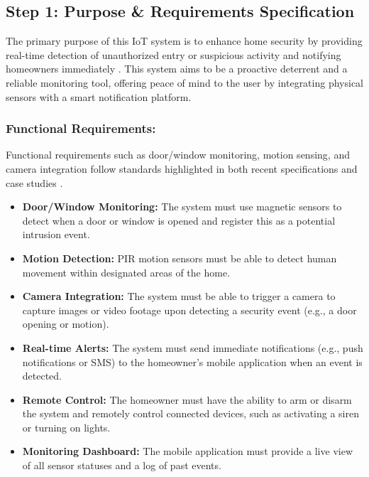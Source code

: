 \documentclass[conference]{IEEEtran}
\begin{document}
\subsection{Step 1: Purpose \& Requirements Specification}
The primary purpose of this IoT system is to enhance home security by providing real-time detection of unauthorized entry or suspicious activity and notifying homeowners immediately \cite{yamini_home_intrusion_2016, achtaich2021guidelines, seerangan_domain_specific_iot_home_automation_2022}. This system aims to be a proactive deterrent and a reliable monitoring tool, offering peace of mind to the user by integrating physical sensors with a smart notification platform.
\subsubsection{\textbf{Functional Requirements:}}
Functional requirements such as door/window monitoring, motion sensing, and camera integration follow standards highlighted in both recent specifications and case studies \cite{wang_iot_devices_security_2024, design_implementation_smart_home_IoT_2024}.
\begin{itemize}
    \item \textbf{Door/Window Monitoring:} The system must use magnetic sensors to detect when a door or window is opened and register this as a potential intrusion event.
    \item \textbf{Motion Detection:} PIR motion sensors must be able to detect human movement within designated areas of the home.
    \item \textbf{Camera Integration:} The system must be able to trigger a camera to capture images or video footage upon detecting a security event (e.g., a door opening or motion).
    \item \textbf{Real-time Alerts:} The system must send immediate notifications (e.g., push notifications or SMS) to the homeowner's mobile application when an event is detected.
    \item \textbf{Remote Control:} The homeowner must have the ability to arm or disarm the system and remotely control connected devices, such as activating a siren or turning on lights.
    \item \textbf{Monitoring Dashboard:} The mobile application must provide a live view of all sensor statuses and a log of past events.
\end{itemize}
\end{document}

